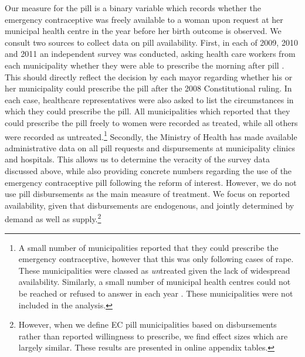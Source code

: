 Our measure for the pill is a binary variable which records whether the 
emergency contraceptive was freely available to a woman upon request at her 
municipal health centre in the year before her birth outcome is observed.  We
consult two sources to collect data on pill availability.  First, in each of 
2009, 2010 and 2011 an independent survey was conducted, asking health care 
workers from each municipality whether they were able to prescribe the morning
after pill \citep{Didesetal2009,Didesetal2010,Didesetal2011}. This should 
directly reflect the decision by each mayor regarding whether his or her
municipality could prescribe the pill after the 2008 Constitutional ruling.  
In each case, healthcare representatives were also asked to list the circumstances 
in which they could prescribe the pill.  All municipalities which reported that
they could prescribe the pill freely to women were recorded as treated, while 
all others were recorded as untreated.\footnote{A small number of 
municipalities reported that they could prescribe the emergency contraceptive, 
however that this was only following cases of rape.  These municipalities were 
classed as \emph{un}treated given the lack of widespread availability.
Similarly, a small number of municipal health centres could not be reached
or refused to answer in each year \citep{Didesetal2009,Didesetal2010,
Didesetal2011}. These municipalities were not included in the analysis.}
Secondly, the Ministry of Health has made available administrative data on
all pill requests and dispursements at municipality clinics and hospitals.
This allows us to determine the veracity of the survey data discussed
above, while also providing concrete numbers regarding the use of the emergency 
contraceptive pill following the reform of interest.  However, we do not
use pill disbursements as the main measure of treatment.  We focus on
reported availability, given that disbursements are endogenous, and
jointly determined by demand as well as supply.\footnote{However, when we
define EC pill municipalities based on disbursements rather than reported
willingness to prescribe, we find effect sizes which are largely similar.
These results are presented in online appendix tables.}


